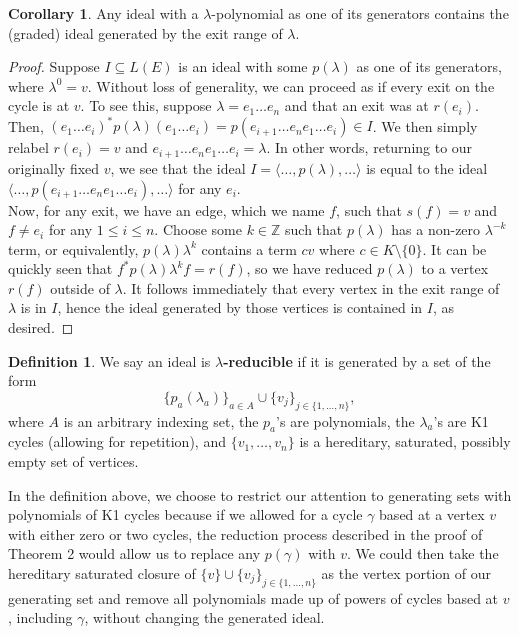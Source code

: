 \documentclass[12pt]{amsart}
\theoremstyle{plain} \numberwithin{equation}{section}
\theoremstyle{definition}
\newtheorem{definition}[theorem]{Definition}
\newtheorem{cor}[theorem]{Corollary}
\theoremstyle{definition}
\begin{document}
\begin{cor}
    Any ideal with a $\lambda$-polynomial as one of its generators contains the (graded) ideal generated by the exit range of $\lambda$.
\end{cor}
\begin{proof}
   Suppose $I\subseteq L(E)$ is an ideal with some $p(\lambda)$ as one of its generators, where $\lambda^0 = v$. Without loss of generality, we can proceed as if every exit on the cycle is at $v$. To see this, suppose $\lambda = e_1\dots e_n$ and that an exit was at $r(e_i)$. Then, $(e_1\dots e_i)^*p(\lambda)(e_1\dots e_i) = p(e_{i+1}\dots e_ne_1\dots e_i)\in I$. We then simply relabel $r(e_i) = v$ and $e_{i+1}\dots e_ne_1\dots e_i = \lambda$. In other words, returning to our originally fixed $v$, we see that the ideal $I = \langle \dots ,p(\lambda),\dots \rangle$ is equal to the ideal $\langle \dots ,p(e_{i+1}\dots e_ne_1\dots e_i),\dots \rangle$ for any $e_i$.\\
   
   Now, for any exit, we have an edge, which we name $f$, such that $s(f) = v$ and $f\neq e_i$ for any $1\leq i\leq n$. Choose some $k \in \mathbb{Z}$ such that $p(\lambda)$ has a non-zero $\lambda^{-k}$ term, or equivalently, $p(\lambda)\lambda^k$ contains a term $cv$ where $c \in K \setminus \{0\}$. It can be quickly seen that $f^*p(\lambda)\lambda^k f = r(f)$, so we have reduced $p(\lambda)$ to a vertex $r(f)$ outside of $\lambda$. It follows immediately that every vertex in the exit range of $\lambda$ is in $I$, hence the ideal generated by those vertices is contained in $I$, as desired.
\end{proof}

\begin{definition}
    We say an ideal is \textbf{$\lambda$-reducible} if it is generated by a set of the form $$\{p_a(\lambda_a)\}_{a\in A} \cup \{v_j\}_{j\in\{1,\dots ,n\}},$$ 
    where $A$ is an arbitrary indexing set, the $p_a$'s are polynomials, the $\lambda_a$'s are K1 cycles (allowing for repetition), and $\{v_1,\dots ,v_n\}$ is a hereditary, saturated, possibly empty set of vertices.
\end{definition}

In the definition above, we choose to restrict our attention to generating sets with polynomials of K1 cycles because if we allowed for a cycle $\gamma$ based at a vertex $v$ with either zero or two cycles, the reduction process described in the proof of Theorem 2 would allow us to replace any $p(\gamma)$ with $v$. We could then take the hereditary saturated closure of $\{v\} \cup \{v_j\}_{j\in\{1,\dots ,n\}}$ as the vertex portion of our generating set and remove all polynomials made up of powers of cycles based at $v$, including $\gamma$, without changing the generated ideal. 
\end{document}
